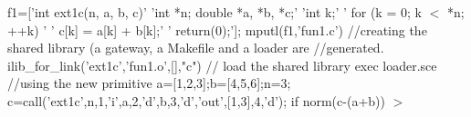 \begin{examples}
  \begin{program}
    f1=['int ext1c(n, a, b, c)'
         'int *n;     double *a, *b, *c;'
         '{int k;'
         '  for (k = 0; k $<$ *n; ++k) '
         '      c[k] = a[k] + b[k];'
         '  return(0);}'];
    mputl(f1,'fun1.c')
    //creating the shared library (a gateway, a Makefile and a loader are 
    //generated. 
    ilib_for_link('ext1c','fun1.o',[],"c") 
    // load the shared library 
    exec loader.sce 
    //using the new primitive
    a=[1,2,3];b=[4,5,6];n=3;
    c=call('ext1c',n,1,'i',a,2,'d',b,3,'d','out',[1,3],4,'d');
    if norm(c-(a+b)) $>$ %
  \end{program}
\end{examples}
\begin{manseealso}
\end{manseealso}

